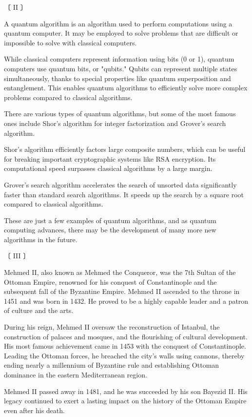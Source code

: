 \documentclass[12pt,a4paper,dvipdfmx]{jarticle}
\begin{document}
\begin{spacing}{1.5}
\newpage

〔 II 〕

A quantum algorithm is an algorithm used to perform computations using a quantum computer. It may be employed to solve problems that are difficult or impossible to solve with classical computers.
	
While classical computers represent information using bits (0 or 1), quantum computers use quantum bits, or "qubits." Qubits can represent multiple states simultaneously, thanks to special properties like quantum superposition and entanglement. This enables quantum algorithms to efficiently solve more complex problems compared to classical algorithms.
	
There are various types of quantum algorithms, but some of the most famous ones include Shor's algorithm for integer factorization and Grover's search algorithm.
	
Shor's algorithm efficiently factors large composite numbers, which can be useful for breaking important cryptographic systems like RSA encryption. Its computational speed surpasses classical algorithms by a large margin.
	
Grover's search algorithm accelerates the search of unsorted data significantly faster than standard search algorithms. It speeds up the search by a square root compared to classical algorithms.
	
These are just a few examples of quantum algorithms, and as quantum computing advances, there may be the development of many more new algorithms in the future.


\newpage

〔 III 〕

Mehmed II, also known as Mehmed the Conqueror, was the 7th Sultan of the Ottoman Empire, renowned for his conquest of Constantinople and the subsequent fall of the Byzantine Empire. Mehmed II ascended to the throne in 1451 and was born in 1432. He proved to be a highly capable leader and a patron of culture and the arts.
	
During his reign, Mehmed II oversaw the reconstruction of Istanbul, the construction of palaces and mosques, and the flourishing of cultural development. His most famous achievement came in 1453 with the conquest of Constantinople. Leading the Ottoman forces, he breached the city's walls using cannons, thereby ending nearly a millennium of Byzantine rule and establishing Ottoman dominance in the eastern Mediterranean region.
	
Mehmed II passed away in 1481, and he was succeeded by his son Bayezid II. His legacy continued to exert a lasting impact on the history of the Ottoman Empire even after his death.
	


\end{spacing}
\end{document}
